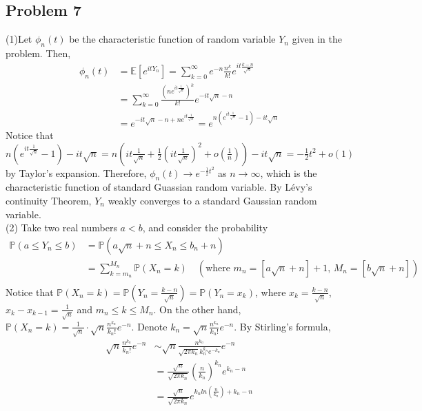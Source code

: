 \documentclass[12pt]{article}
\begin{document}
	\subsection*{Problem 7}
(1)Let $\phi_{n}(t)$ be the characteristic function of random variable $Y_{n}$ given in the problem. Then,
\begin{align*}
\phi_{n}(t)&=\mathbb{E}[e^{itY_{n}}]=\sum_{k=0}^{\infty}e^{-n}\frac{n^k}{k!}e^{it\frac{k-n}{\sqrt{n}}}\\
&=\sum_{k=0}^{\infty}\frac{(ne^{it\frac{1}{\sqrt{n}}})^{k}}{k!}e^{-it\sqrt{n}-n}\\
&=e^{-it\sqrt{n}-n+ne^{it\frac{1}{\sqrt{n}}}} = e^{n(e^{it\frac{1}{\sqrt{n}}}-1)-it\sqrt{n}}
\end{align*}
Notice that $n(e^{it\frac{1}{\sqrt{n}}}-1)-it\sqrt{n}=n(it\frac{1}{\sqrt{n}}+\frac{1}{2}(it\frac{1}{\sqrt{n}})^2+o(\frac{1}{n}))-it\sqrt{n}=-\frac{1}{2}t^2+o(1)$ by Taylor's expansion. Therefore, $\phi_{n}(t)\rightarrow e^{-\frac{1}{2}t^2}$ as $n\rightarrow\infty$, which is the characteristic function of standard Guassian random variable. By L\'{e}vy's continuity Theorem,  $Y_{n}$ weakly converges to a standard Gaussian random variable.\\
(2) Take two real numbers $a<b$, and consider the probability
\begin{align*}
	\mathbb{P}(a\leqslant Y_{n}\leqslant b)&=\mathbb{P}(a\sqrt{n}+n\leqslant X_{n}\leqslant b_{n}+n)\\
	&= \sum_{k=m_{n}}^{M_{n}}\mathbb{P}(X_{n}=k)\quad(\text{where $m_{n}=[a\sqrt{n}+n]+1$, $M_{n}=[b\sqrt{n}+n]$})\\
	\end{align*}
Notice that $\mathbb{P}(X_{n}=k)=\mathbb{P}(Y_{n}=\frac{k-n}{\sqrt{n}})=\mathbb{P}(Y_{n}=x_{k})$, where $x_{k}=\frac{k-n}{\sqrt{n}}$, $x_{k}-x_{k-1}=\frac{1}{\sqrt{n}}$ and $m_{n}\leqslant k \leqslant M_{n}$. On the other hand, $\mathbb{P}(X_{n}=k)=\frac{1}{\sqrt{n}}\cdot \sqrt{n}\frac{n^{k_{n}}}{k_{n}!}e^{-n}$. Denote $k_{n}=\sqrt{n}\frac{n^{k_{n}}}{k_{n}!}e^{-n}$. By Stirling's formula, 
\begin{align*}
\sqrt{n}\frac{n^{k_{n}}}{k_{n}!}e^{-n} &\sim \sqrt{n}\frac{n^{k_{n}}}{\sqrt{2\pi k_{n}}k_{n}^{k_{n}}e^{-k_{n}}} e^{-n}\\
&=\frac{\sqrt{n}}{\sqrt{2\pi k_{n}}}(\frac{n}{k_{n}})^{k_{n}}e^{k_{n}-n}\\
&=\frac{\sqrt{n}}{\sqrt{2\pi k_{n}}}e^{k_{n}ln(\frac{n}{k_{n}})+k_{n}-n}\\
\end{align*}
\end{document}
